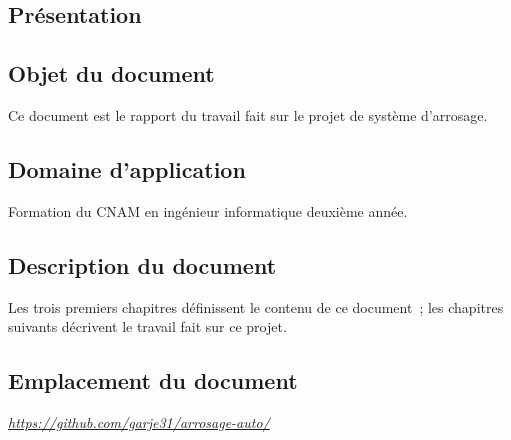 \textcolor[RGB]{46, 116, 181}{\chapter{Présentation}}
\section{Objet du document}
Ce document est le rapport du travail fait sur le projet de système d'arrosage.

\section{Domaine d'application}
Formation du CNAM en ingénieur informatique deuxième année.

\section{Description du document}
Les trois premiers chapitres définissent le contenu de ce document~; les chapitres suivants décrivent le travail fait sur ce projet.

\section{Emplacement du document}
\href{https://github.com/garje31/arrosage-auto/}{\emph{https://github.com/garje31/arrosage-auto/}}

